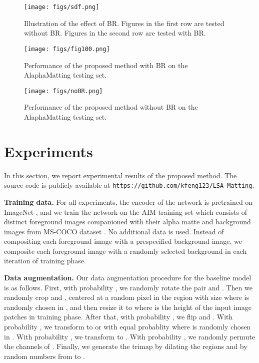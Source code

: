 \documentclass{article}
\theoremstyle{plain}
\begin{document}
\begin{figure*}[t]
  \centering
  \texttt{[image: figs/sdf.png]}
  \caption{Illustration of the effect of BR.
      Figures in the first row are tested without BR.
      Figures in the second row are tested with BR.
  }
  \label{fig:666}
\end{figure*}

\begin{figure*}[t]
  \centering
  \texttt{[image: figs/fig100.png]}
  \caption{Performance of the proposed method with BR on the AlaphaMatting testing set.}
  \label{fig:100}
\end{figure*}

\begin{figure*}[t]
  \centering
  \texttt{[image: figs/noBR.png]}
  \caption{Performance of the proposed method without BR on the AlaphaMatting testing set.}
  \label{fig:101}
\end{figure*}


\section{Experiments}
In this section, we report experimental results of the proposed method.
The source code is publicly available at 
\texttt{https://github.com/kfeng123/LSA-Matting}.


\textbf{Training data.}
For all experiments,
the encoder of the network is pretrained on ImageNet \cite{Deng2009ImageNet},
and we train the network on the AIM training set \cite{Xu2017DeepImageMatting} which consists of  distinct foreground images companioned with their alpha matte and
 background images from MS-COCO dataset \cite{Lin2014MS-COCO}.
No additional data is used.
Instead of compositing each foreground image with a prespecified background image, we composite each foreground image with a randomly selected background in each iteration of training phase.


\textbf{Data augmentation.}
Our data augmentation procedure for the baseline model is as follows.
First, with probability , we randomly rotate the pair  and .
Then we randomly crop  and , centered at a random pixel in the region  with size  where  is randomly chosen in , and then resize it to  where  is the height of the input image patches in training phase.
After that, with probability , we flip  and .
With probability , we transform  to
 or  with equal probablity where  is randomly chosen in .
With probability , we transform  to .
With probability , we randomly permute the  channels of .
Finally, we generate the trimap by dilating the regions  and  by random numbers from  to .
\end{document}
